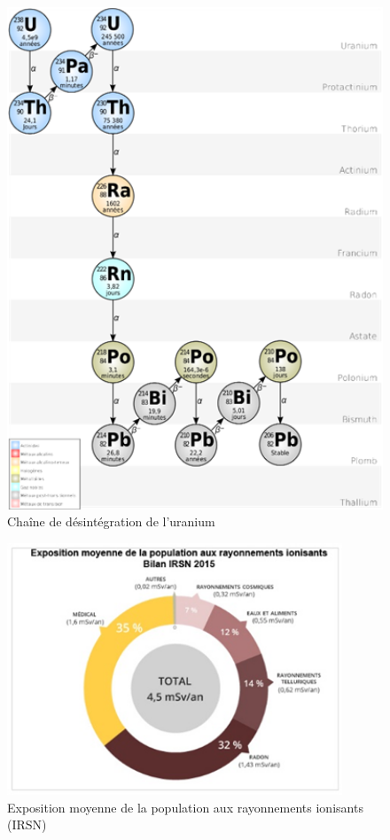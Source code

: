 \documentclass{article}
\begin{document}
\begin{figure}[H]
    \centering
    \includegraphics[width=13cm]{II_A2_1.png}
    \caption{Chaîne de désintégration de l’uranium}
    \label{fig:desintegration_uranium}
\end{figure}

\begin{figure}[H]
    \centering
    \includegraphics[width=10cm]{II_A2_4.png}
    \caption{Exposition moyenne de la population aux rayonnements ionisants (IRSN)}
    \label{fig:exposition_moyenne}
\end{figure}
\end{document}

